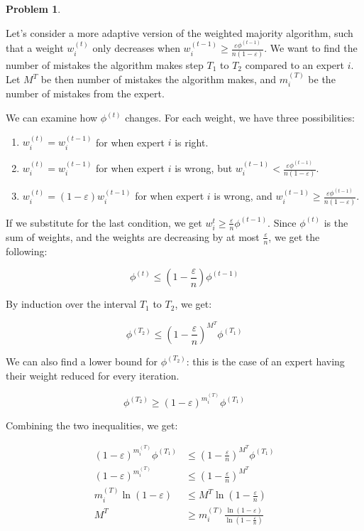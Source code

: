 \documentclass[11pt]{article}
\theoremstyle{definition}
\theoremstyle{case}
\theoremstyle{theorem}
\newtheorem{prob}{Problem}
\begin{document}
\newpage

\begin{prob}
\end{prob}

Let's consider a more adaptive version of the weighted majority algorithm, such that a weight $w_i^{(t)}$ only 
decreases when $w_i^{(t-1)} \geq \frac{\varepsilon \phi^{(t-1)}}{n(1-\varepsilon)}$. We want to find the
number of mistakes the algorithm makes step $T_1$ to $T_2$ compared to an expert $i$. Let $M^{T}$ be
then number of mistakes the algorithm makes, and $m^{(T)}_i$ be the number of mistakes from the expert. 

We can examine how $\phi^{(t)}$ changes. For each weight, we have three possibilities:

\begin{enumerate}

\item $w_i^{(t)} = w_i^{(t-1)}$ for when expert $i$ is right.

\item $w_i^{(t)} = w_i^{(t-1)}$ for when expert $i$ is wrong, but $w_i^{(t-1)} < \frac{\varepsilon \phi^{(t-1)}}{n(1-\varepsilon)}$.

\item $w_i^{(t)} = (1-\varepsilon)w_i^{(t-1)}$ for when expert $i$ is wrong, and $w_i^{(t - 1)} \geq \frac{\varepsilon \phi^{(t-1)}}{n(1-\varepsilon)}$.

\end{enumerate}

If we substitute for the last condition, we get $w_i^{t} \geq \frac{\varepsilon}{n} \phi^{(t-1)}$. Since $\phi^{(t)}$ is
the sum of weights, and the weights are decreasing by at most $\frac{\varepsilon}{n}$, we get the following:

\[
  \phi^{(t)} \leq (1 - \frac{\varepsilon}{n}) \phi^{(t - 1)}
\]

By induction over the interval $T_1$ to $T_2$, we get:

\[
  \phi^{(T_2)} \leq (1 - \frac{\varepsilon}{n})^{M^T} \phi^{(T_1)}
\]

We can also find a lower bound for $\phi^{(T_2)}$: this is the case of an
expert having their weight reduced for every iteration.

\[
 \phi^{(T_2)} \geq (1 - \varepsilon)^{m_i^{(T)}} \phi^{(T_1)}
\]

Combining the two inequalities, we get:

\begin{align*}
  (1 - \varepsilon)^{m_i^{(T)}} \phi^{(T_1)} &\leq (1 - \frac{\varepsilon}{n})^{M^T} \phi^{(T_1)} \\
               (1 - \varepsilon)^{m_i^{(T)}} &\leq (1 - \frac{\varepsilon}{n})^{M^T} \\
            m_i^{(T)} \ln{(1 - \varepsilon)} &\leq M^T \ln{(1 - \frac{\varepsilon}{n})} \\
                                         M^T &\geq m_i^{(T)} \frac{\ln(1 - \varepsilon)}{\ln(1 - \frac{\varepsilon}{n})} 
\end{align*}
\end{document}
